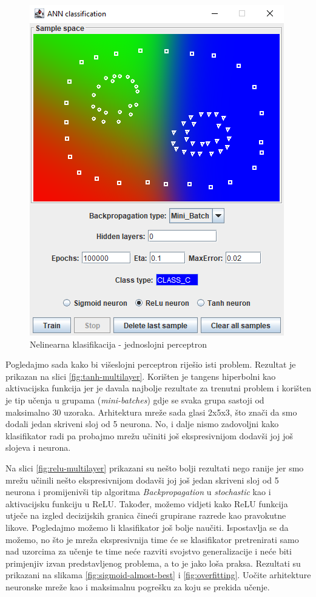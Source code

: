 \documentclass[times, utf8, zavrsni]{fer}
\begin{document}
\begin{figure}[H]
    \centering
    \includegraphics[scale=0.6]{img/single-layer-fail.png}
    \caption[Caption for LOF]{Nelinearna klasifikacija - jednoslojni perceptron}
    \label{fig:single-layer-fail}
\end{figure}

Pogledajmo sada kako bi višeslojni perceptron riješio isti problem. Rezultat je prikazan na slici \ref{fig:tanh-multilayer}. Korišten je tangens hiperbolni kao aktivacijska funkcija jer je davala najbolje rezultate za trenutni problem i korišten je tip učenja u grupama (\textit{mini-batches}) gdje se svaka grupa sastoji od maksimalno 30 uzoraka. Arhitektura mreže sada glasi 2x5x3, što znači da smo dodali jedan skriveni sloj od 5 neurona. No, i dalje nismo zadovoljni kako klasifikator radi pa probajmo mrežu učiniti još ekspresivnijom dodavši joj još slojeva i neurona.

Na slici \ref{fig:relu-multilayer} prikazani su nešto bolji rezultati nego ranije jer smo mrežu učinili nešto ekspresivnijom dodavši joj još jedan skriveni sloj od 5 neurona i promijenivši tip algoritma \textit{Backpropagation} u \textit{stochastic} kao i aktivacijsku funkciju u ReLU. Također, možemo vidjeti kako ReLU funkcija utječe na izgled decizijskih granica čineći grupirane razrede kao pravokutne likove. Pogledajmo možemo li klasifikator još bolje naučiti. Ispostavlja se da možemo, no što je mreža ekspresivnija time će se klasifikator pretrenirati samo nad uzorcima za učenje te time neće razviti svojstvo generalizacije i neće biti primjenjiv izvan predstavljenog problema, a to je jako loša praksa. Rezultati su prikazani na slikama \ref{fig:sigmoid-almost-best} i \ref{fig:overfitting}. Uočite arhitekture neuronske mreže kao i maksimalnu pogrešku za koju se prekida učenje.
\end{document}
